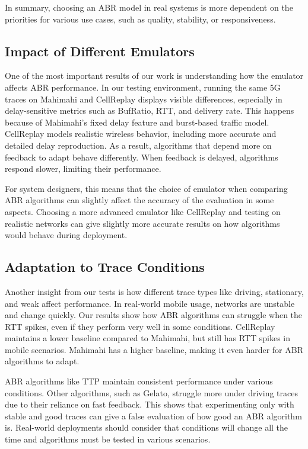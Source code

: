 In summary, choosing an ABR model in real systems is more dependent on the priorities for various use cases, such as quality, stability, or responsiveness.

\subsection*{Impact of Different Emulators}

One of the most important results of our work is understanding how the emulator affects ABR performance. In our testing environment, running the same 5G traces on Mahimahi and CellReplay displays visible differences, especially in delay-sensitive metrics such as BufRatio, RTT, and delivery rate. This happens because of Mahimahi's fixed delay feature and burst-based traffic model. CellReplay models realistic wireless behavior, including more accurate and detailed delay reproduction. As a result, algorithms that depend more on feedback to adapt behave differently. When feedback is delayed, algorithms respond slower, limiting their performance.

For system designers, this means that the choice of emulator when comparing ABR algorithms can slightly affect the accuracy of the evaluation in some aspects. Choosing a more advanced emulator like CellReplay and testing on realistic networks can give slightly more accurate results on how algorithms would behave during deployment.

\subsection*{Adaptation to Trace Conditions}

Another insight from our tests is how different trace types like driving, stationary, and weak affect performance. In real-world mobile usage, networks are unstable and change quickly. Our results show how ABR algorithms can struggle when the RTT spikes, even if they perform very well in some conditions. CellReplay maintains a lower baseline compared to Mahimahi, but still has RTT spikes in mobile scenarios. Mahimahi has a higher baseline, making it even harder for ABR algorithms to adapt.

ABR algorithms like TTP maintain consistent performance under various conditions. Other algorithms, such as Gelato, struggle more under driving traces due to their reliance on fast feedback. This shows that experimenting only with stable and good traces can give a false evaluation of how good an ABR algorithm is. Real-world deployments should consider that conditions will change all the time and algorithms must be tested in various scenarios.


